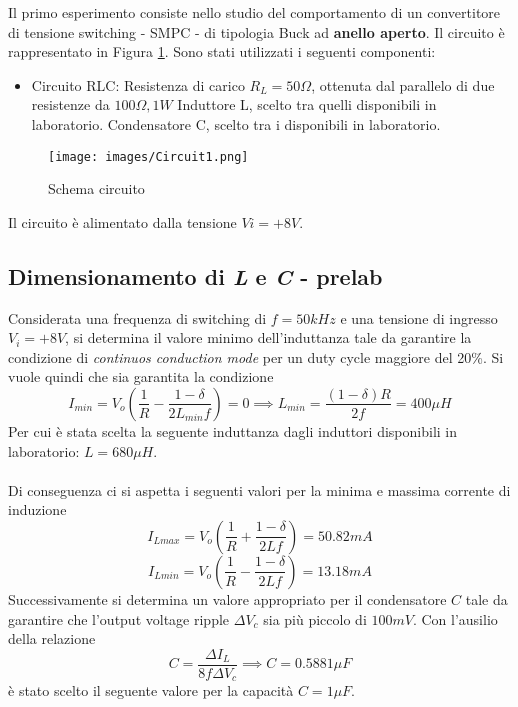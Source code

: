 Il primo esperimento consiste nello studio del comportamento di un convertitore di tensione switching - SMPC - di tipologia Buck ad \textbf{anello aperto}. Il circuito è rappresentato in Figura \ref{fig:Circuit1}. Sono stati utilizzati i seguenti componenti:
\begin{itemize}
    \item Circuito RLC:
    \subitem Resistenza di carico $R_L=50\Omega$, ottenuta dal parallelo di due resistenze da $100\Omega,1W$
    \subitem Induttore L, scelto tra quelli disponibili in laboratorio.
    \subitem Condensatore C, scelto tra i disponibili in laboratorio.
\end{itemize}
\begin{figure}[H]
    \centering
    \texttt{[image: images/Circuit1.png]}
    \caption{Schema circuito}
    \label{fig:Circuit1}
\end{figure}
Il circuito è alimentato dalla tensione $Vi=+8V$.
\subsection{Dimensionamento di \textit{L} e \textit{C} - prelab}\label{ch:Cap1}
Considerata una frequenza di switching di $f=50kHz$ e una tensione di ingresso $V_i=+8V$, si determina il valore minimo dell'induttanza tale da garantire la condizione di \textit{continuos conduction mode} per un  duty cycle maggiore del 20\%. Si vuole quindi che sia garantita la condizione
\begin{equation}
    I_{min}=V_o\left(\frac{1}{R}-\frac{1-\delta}{2L_{min}f}\right)=0\implies L_{min}=\frac{(1-\delta)R}{2f}=400\mu H
\end{equation}
Per cui è stata scelta la seguente induttanza dagli induttori disponibili in laboratorio: $L=680\mu H$.\\\\
Di conseguenza ci si aspetta i seguenti valori per la minima e massima corrente di induzione
\begin{equation}
    I_{Lmax}=V_o\left(\frac{1}{R}+\frac{1-\delta}{2Lf}\right)=50.82mA
\end{equation}
\begin{equation}
    I_{Lmin}=V_o\left(\frac{1}{R}-\frac{1-\delta}{2Lf}\right)=13.18mA
\end{equation}
Successivamente si determina un valore appropriato per il condensatore $C$ tale da garantire che l'output voltage ripple $\Delta V_c$ sia più piccolo di $100mV$. Con l'ausilio della relazione
\begin{equation}
    C=\frac{\Delta I_L}{8f\Delta V_c}\implies C=0.5881\mu F
\end{equation}
è stato scelto il seguente valore per la capacità $C=1\mu F$.






